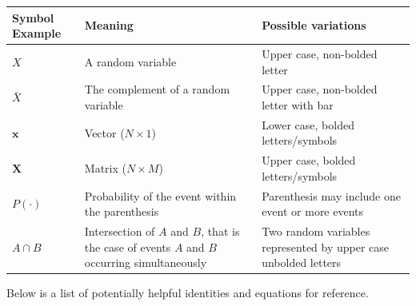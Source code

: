 \documentclass[
  letterpaper,
  DIV=11,
  numbers=noendperiod]{scrartcl}
\begin{document}
\begin{longtable}[]{@{}
  >{\raggedright\arraybackslash}p{}
  >{\raggedright\arraybackslash}p{}
  >{\raggedright\arraybackslash}p{}@{}}
\toprule\noalign{}
\begin{minipage}[b]{\linewidth}\raggedright
Symbol Example
\end{minipage} & \begin{minipage}[b]{\linewidth}\raggedright
Meaning
\end{minipage} & \begin{minipage}[b]{\linewidth}\raggedright
Possible variations
\end{minipage} \\
\midrule\noalign{}
\endhead
\bottomrule\noalign{}
\endlastfoot
\(X\) & A random variable & Upper case, non-bolded letter \\
\(\bar{X}\) & The complement of a random variable & Upper case,
non-bolded letter with bar \\
\(\mathbf{x}\) & Vector (\(N \times 1\)) & Lower case, bolded
letters/symbols \\
\(\mathbf{X}\) & Matrix (\(N \times M\)) & Upper case, bolded
letters/symbols \\
\(P(\cdot)\) & Probability of the event within the parenthesis &
Parenthesis may include one event or more events \\
\(A \cap B\) & Intersection of \(A\) and \(B\), that is the case of
events \(A\) and \(B\) occurring simultaneously & Two random variables
represented by upper case unbolded letters \\
\end{longtable}

Below is a list of potentially helpful identities and equations for
reference.
\end{document}

